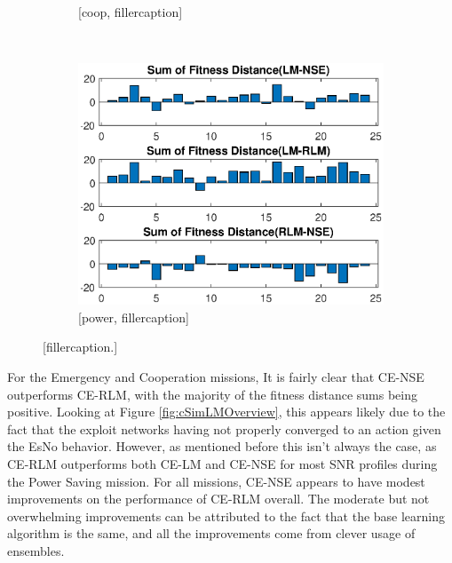 \begin{figure}[ht]
\begin{subfigure}{0.55\linewidth}
	\caption{[coop, fillercaption]}
	\label{fig:cSimUnweightCoop}
\end{subfigure}\\
\begin{center}
\begin{subfigure}{0.55\linewidth}
	\centering
	\includegraphics[scale=0.6]{figures/c_sim_results/power_unweighted_sumFitness.eps}
	\caption{[power, fillercaption]}
	\label{fig:cSimUnweightPower}
\end{subfigure}
\end{center}
\caption{[fillercaption.]}
\label{fig:unweight_sumFit}
\end{figure}

\par For the Emergency and Cooperation missions, It is fairly clear that CE-NSE outperforms CE-RLM, with the majority of the fitness distance sums being positive. Looking at Figure \ref{fig:cSimLMOverview}, this appears likely due to the fact that the exploit networks having not properly converged to an action given the EsNo behavior. However, as mentioned before this isn't always the case, as CE-RLM outperforms both CE-LM and CE-NSE for most SNR profiles during the Power Saving mission. For all missions, CE-NSE appears to have modest improvements on the performance of CE-RLM overall. The moderate but not overwhelming improvements can be attributed to the fact that the base learning algorithm is the same, and all the improvements come from clever usage of ensembles.

